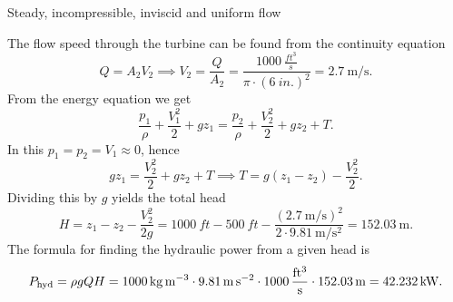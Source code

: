 \begin{assumptions}
  \item Steady, incompressible, inviscid and uniform flow
\end{assumptions}

\begin{derivation}
  The flow speed through the turbine can be found from the continuity equation
  \[ 
  Q = A_2 V_2 \implies V_2 = \frac{Q}{A_2} = \frac{\qty{1000}{\frac{ft^3}{s}} }{\pi \cdot \left( \qty{6}{in.}  \right)^2} = \qty{2,7}{\m\per\s} 
  .\]
  From the energy equation we get
  \[ 
  \frac{p_1}{\rho} + \frac{V_1^2}{2} + gz_1 = \frac{p_2}{\rho} + \frac{V_2^2}{2} + gz_2 + T
  .\]
  In this $p_1 = p_2 = V_1 \approx 0$, hence
  \[ 
  gz_1 = \frac{V_2^2}{2} + gz_2 + T \implies T = g \left( z_1 - z_2 \right) - \frac{V_2^2}{2}
  .\]
  Dividing this by $g$ yields the total head
  \[ 
  H = z_1 - z_2 - \frac{V_2^2}{2 g} = \qty{1000}{ft} - \qty{500}{ft}  - \frac{\left( \qty{2,7}{\m\per\s}  \right)^2}{2 \cdot \qty{9,81}{\m\per\square\s} } = \qty{152,03}{\m} 
  .\]
  The formula for finding the hydraulic power from a given head is
  \[ 
  P_{\mathrm{hyd}} = \rho g Q H = \qty{1000}{\kg\per\cubic\m}  \cdot \qty{9,81}{\m\per\s\squared}  \cdot \qty{1000}{\frac{ft^3}{\s}}  \cdot \qty{152,03}{\m} = \qty{42,232}{\kW}  
  .\]
\end{derivation}


